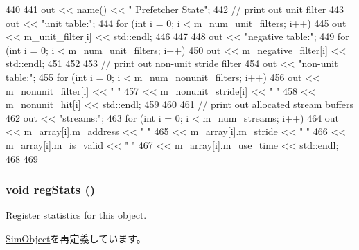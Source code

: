 \begin{DoxyCode}
440 {
441     out << name() << " Prefetcher State\n";
442     // print out unit filter
443     out << "unit table:\n";
444     for (int i = 0; i < m_num_unit_filters; i++) {
445         out << m_unit_filter[i] << std::endl;
446     }
447 
448     out << "negative table:\n";
449     for (int i = 0; i < m_num_unit_filters; i++) {
450         out << m_negative_filter[i] << std::endl;
451     }
452 
453     // print out non-unit stride filter
454     out << "non-unit table:\n";
455     for (int i = 0; i < m_num_nonunit_filters; i++) {
456         out << m_nonunit_filter[i] << " "
457             << m_nonunit_stride[i] << " "
458             << m_nonunit_hit[i] << std::endl;
459     }
460 
461     // print out allocated stream buffers
462     out << "streams:\n";
463     for (int i = 0; i < m_num_streams; i++) {
464         out << m_array[i].m_address << " "
465             << m_array[i].m_stride << " "
466             << m_array[i].m_is_valid << " "
467             << m_array[i].m_use_time << std::endl;
468     }
469 }
\end{DoxyCode}
\hypertarget{classPrefetcher_a4dc637449366fcdfc4e764cdf12d9b11}{
\subsubsection[{regStats}]{\setlength{\rightskip}{0pt plus 5cm}void regStats ()}}
\label{classPrefetcher_a4dc637449366fcdfc4e764cdf12d9b11}
\hyperlink{classRegister}{Register} statistics for this object. 

\hyperlink{classSimObject_a4dc637449366fcdfc4e764cdf12d9b11}{SimObject}を再定義しています。


